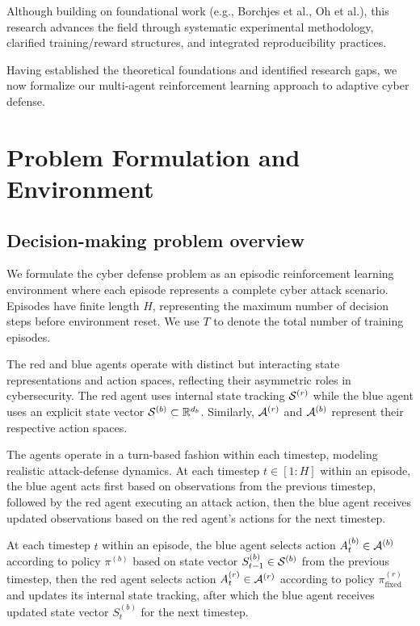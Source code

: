 \documentclass[12pt,oneside]{article}
\begin{document}
Although building on foundational work (e.g., Borchjes et al., Oh et al.), this research advances the field through systematic experimental methodology, clarified training/reward structures, and integrated reproducibility practices.

Having established the theoretical foundations and identified research gaps, we now formalize our multi-agent reinforcement learning approach to adaptive cyber defense.

\clearpage
\section{Problem Formulation and Environment}

\subsection{Decision-making problem overview}

We formulate the cyber defense problem as an episodic reinforcement learning environment where each episode represents a complete cyber attack scenario. Episodes have finite length $H$, representing the maximum number of decision steps before environment reset. We use $T$ to denote the total number of training episodes.

The red and blue agents operate with distinct but interacting state representations and action spaces, reflecting their asymmetric roles in cybersecurity. The red agent uses internal state tracking $\mathcal{S}^{(r)}$ while the blue agent uses an explicit state vector $\mathcal{S}^{(b)} \subset \mathbb{R}^{d_b}$. Similarly, $\mathcal{A}^{(r)}$ and $\mathcal{A}^{(b)}$ represent their respective action spaces.

The agents operate in a turn-based fashion within each timestep, modeling realistic attack-defense dynamics. At each timestep $t \in [1:H]$ within an episode, the blue agent acts first based on observations from the previous timestep, followed by the red agent executing an attack action, then the blue agent receives updated observations based on the red agent's actions for the next timestep.

At each timestep $t$ within an episode, the blue agent selects action $A_t^{(b)} \in \mathcal{A}^{(b)}$ according to policy $\pi^{(b)}$ based on state vector $S_{t-1}^{(b)} \in \mathcal{S}^{(b)}$ from the previous timestep, then the red agent selects action $A_t^{(r)} \in \mathcal{A}^{(r)}$ according to policy $\pi^{(r)}_{\text{fixed}}$ and updates its internal state tracking, after which the blue agent receives updated state vector $S_t^{(b)}$ for the next timestep.
\end{document}
